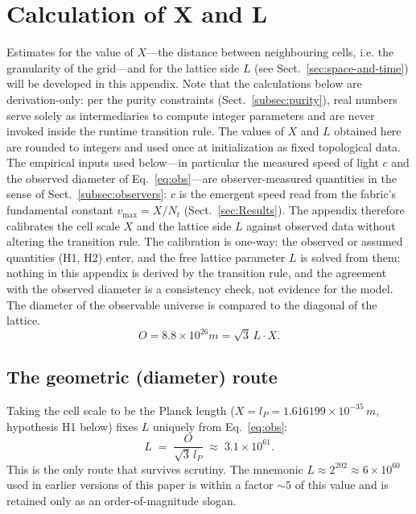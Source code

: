 \documentclass{ijuc}
\begin{document}
\section{Calculation of X and L\label{sec:Calculation-of-X}}
Estimates for the value of $X$---the distance between neighbouring cells, i.e. the granularity of the grid---and for the lattice side $L$ (see Sect.~\ref{sec:space-and-time}) will be developed in this appendix.
Note that the calculations below are derivation-only: per the purity constraints (Sect.~\ref{subsec:purity}), real numbers serve solely as intermediaries to compute integer parameters and are never invoked inside the runtime transition rule.  The values of $X$ and $L$ obtained here are rounded to integers and used once at initialization as fixed topological data.
The empirical inputs used below---in particular the measured speed of light $c$ and the observed diameter of Eq.~\eqref{eq:obs}---are observer-measured quantities in the sense of Sect.~\ref{subsec:observers}: $c$ is the emergent speed read from the fabric's fundamental constant $v_{\max}=X/N_t$ (Sect.~\ref{sec:Results}). The appendix therefore calibrates the cell scale $X$ and the lattice side $L$ against observed data without altering the transition rule.  The calibration is one-way: the observed or assumed quantities (H1, H2) enter, and the free lattice parameter $L$ is solved from them; nothing in this appendix is derived by the transition rule, and the agreement with the observed diameter is a consistency check, not evidence for the model.
The diameter of the observable universe \cite{halpbern} is compared
to the diagonal of the lattice.
\begin{equation}
O=8.8\times10^{26}m=\sqrt{3}\,L\cdot X.\label{eq:obs}
\end{equation}
\subsection{The geometric (diameter) route}
Taking the cell scale to be the Planck length ($X=l_{P}=1.616199\times10^{-35}\,m$, hypothesis H1 below) fixes $L$ uniquely from Eq.~\eqref{eq:obs}:
\[
L \;=\; \frac{O}{\sqrt{3}\,l_{P}} \;\approx\; 3.1\times10^{61}.
\]
This is the only route that survives scrutiny.  The mnemonic $L\approx2^{202}\approx6\times10^{60}$ used in earlier versions of this paper is within a factor $\sim5$ of this value and is retained only as an order-of-magnitude slogan.
\end{document}
